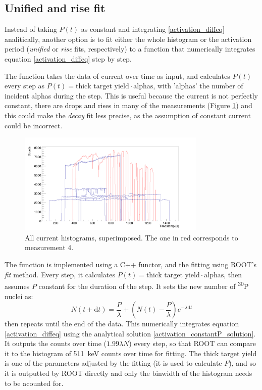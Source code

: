 \documentclass[a4paper,12pt]{report}
\newcommand{\dif}{\text{d}}
\newcommand{\Piso}{\textsuperscript{30}P }
\begin{document}
\subsection{Unified and rise fit}
Instead of taking $P(t)$ as constant and integrating \ref{activation_diffeq} analitically, another option is to fit either the whole histogram or the activation period (\textit{unified} or \textit{rise} fits, respectively) to a function that numerically integrates equation \ref{activation_diffeq} step by step.

The function takes the data of current over time as input, and calculates $P(t)$ every step as $P(t) = \text{thick target yield}\cdot\text{alphas}$, with 'alphas' the number of incident alphas during the step.
This is useful because the current is not perfectly constant, there are drops and rises in many of the measurements (Figure \ref{current_histograms}) and this could make the \textit{decay} fit less precise, as the assumption of constant current could be incorrect.
\\
\begin{figure}[H]
	\centering
	\includegraphics[width=0.80\textwidth]{current_histograms.png}
	\caption{All current histograms, superimposed.
	The one in red corresponds to measurement 4.}
	\label{current_histograms}
\end{figure}

The function is implemented using a C++ functor, and the fitting using ROOT's \textit{fit} method.
Every step, it calculates $P(t)=\text{thick target yield}\cdot\text{alphas}$, then assumes $P$ constant for the duration of the step.
It sets the new number of \Piso nuclei as:
\begin{equation}
	N(t+\dif t)=\frac{P}{\lambda} + \left( N(t)-\frac{P}{\lambda} \right) e^{-\lambda \dif t}
\end{equation}
then repeats until the end of the data.
This numerically integrates equation \ref{activation_diffeq} using the analytical solution \ref{activation_constantP_solution}.
It outputs the counts over time ($1.99 \lambda N$) every step, so that ROOT can compare it to the histogram of \qty{511}{\keV} counts over time for fitting.
The thick target yield is one of the parameters adjusted by the fitting (it is used to calculate $P$), and so it is outputted by ROOT directly and only the binwidth of the histogram needs to be acounted for.
\end{document}
